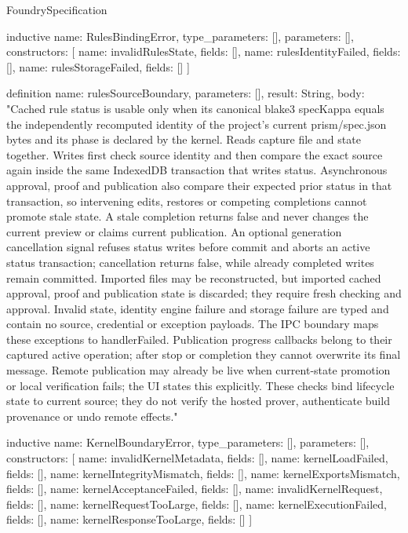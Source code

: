 \begin{lexlean}{FoundrySpecification}
\begin{semanticmodule}
inductive{
  name: RulesBindingError,
  type_parameters: [],
  parameters: [],
  constructors: [
    {name: invalidRulesState, fields: []},
    {name: rulesIdentityFailed, fields: []},
    {name: rulesStorageFailed, fields: []}
  ]
}

definition{
  name: rulesSourceBoundary,
  parameters: [],
  result: String,
  body: "Cached rule status is usable only when its canonical blake3 specKappa equals the independently recomputed identity of the project's current prism/spec.json bytes and its phase is declared by the kernel. Reads capture file and state together. Writes first check source identity and then compare the exact source again inside the same IndexedDB transaction that writes status. Asynchronous approval, proof and publication also compare their expected prior status in that transaction, so intervening edits, restores or competing completions cannot promote stale state. A stale completion returns false and never changes the current preview or claims current publication. An optional generation cancellation signal refuses status writes before commit and aborts an active status transaction; cancellation returns false, while already completed writes remain committed. Imported files may be reconstructed, but imported cached approval, proof and publication state is discarded; they require fresh checking and approval. Invalid state, identity engine failure and storage failure are typed and contain no source, credential or exception payloads. The IPC boundary maps these exceptions to handlerFailed. Publication progress callbacks belong to their captured active operation; after stop or completion they cannot overwrite its final message. Remote publication may already be live when current-state promotion or local verification fails; the UI states this explicitly. These checks bind lifecycle state to current source; they do not verify the hosted prover, authenticate build provenance or undo remote effects."
}

inductive{
  name: KernelBoundaryError,
  type_parameters: [],
  parameters: [],
  constructors: [
    {name: invalidKernelMetadata, fields: []},
    {name: kernelLoadFailed, fields: []},
    {name: kernelIntegrityMismatch, fields: []},
    {name: kernelExportsMismatch, fields: []},
    {name: kernelAcceptanceFailed, fields: []},
    {name: invalidKernelRequest, fields: []},
    {name: kernelRequestTooLarge, fields: []},
    {name: kernelExecutionFailed, fields: []},
    {name: kernelResponseTooLarge, fields: []}
  ]
}


\end{semanticmodule}
\end{lexlean}
